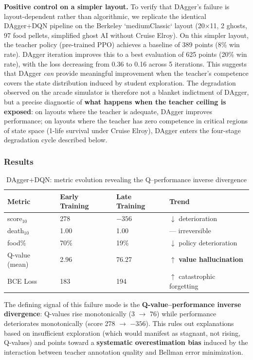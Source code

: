 \documentclass[11pt,a4paper]{article}
\theoremstyle{definition}
\begin{document}
\textbf{Positive control on a simpler layout.}
To verify that DAgger's failure is layout-dependent rather than algorithmic, we replicate the identical DAgger+DQN pipeline on the Berkeley `mediumClassic` layout (20$\times$11, 2 ghosts, 97 food pellets, simplified ghost AI without Cruise Elroy).
On this simpler layout, the teacher policy (pre-trained PPO) achieves a baseline of 389 points (8\% win rate).
DAgger iteration improves this to a best evaluation of 625 points (20\% win rate), with the loss decreasing from 0.36 to 0.16 across 5 iterations.
This suggests that DAgger \textit{can} provide meaningful improvement when the teacher's competence covers the state distribution induced by student exploration.
The degradation observed on the arcade simulator is therefore not a blanket indictment of DAgger, but a precise diagnostic of \textbf{what happens when the teacher ceiling is exposed}: on layouts where the teacher is adequate, DAgger improves performance; on layouts where the teacher has zero competence in critical regions of state space (1-life survival under Cruise Elroy), DAgger enters the four-stage degradation cycle described below.

\subsubsection{Results}

\begin{table}[ht]
\centering
\small
\caption{DAgger+DQN: metric evolution revealing the Q--performance inverse divergence}
\label{tab:dagger-results}
\begin{tabular}{@{}p{2.8cm}p{2.8cm}p{2.8cm}p{3.2cm}@{}}
\toprule
\textbf{Metric} & \textbf{Early Training} & \textbf{Late Training} & \textbf{Trend} \\
\midrule
score$_{10}$ & 278 & $-356$ & $\downarrow$ deterioration \\
death$_{10}$ & 1.00 & 1.00 & --- irreversible \\
food\% & 70\% & 19\% & $\downarrow$ policy deterioration \\
Q-value (mean) & 2.96 & 76.27 & $\uparrow$ \textbf{value hallucination} \\
BCE Loss & 183 & 194 & $\uparrow$ catastrophic forgetting \\
\bottomrule
\end{tabular}
\end{table}

The defining signal of this failure mode is the \textbf{Q-value--performance inverse divergence}: Q-values rise monotonically (3 $\to$ 76) while performance deteriorates monotonically (score 278 $\to$ $-356$).
This rules out explanations based on insufficient exploration (which would manifest as stagnant, not rising, Q-values) and points toward a \textbf{systematic overestimation bias} induced by the interaction between teacher annotation quality and Bellman error minimization.
\end{document}
